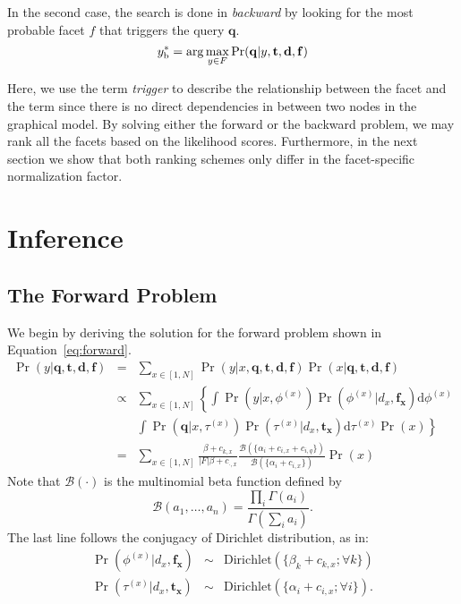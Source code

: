 In the second case, the search is done in \emph{backward} by looking for the most probable facet $f$ that triggers the query $\mathbf{q}$.
\begin{equation}y^*_{\rm b} = \arg\max_{y \in F} \Pr(\mathbf{q}|y, \mathbf{t}, \mathbf{d}, \mathbf{f}) \label{eq:backward} \end{equation}

Here, we use the term \emph{trigger} to describe the relationship between the
facet and the term since there is no direct dependencies in between two nodes
in the graphical model.  By solving either the forward or the backward problem,
we may rank all the facets based on the likelihood scores.  Furthermore, in the
next section we show that both ranking schemes only differ in the
facet-specific normalization factor.

\section{Inference}

\subsection{The Forward Problem}
We begin by deriving the solution for the forward problem shown in
Equation~\eqref{eq:forward}. 
\begin{eqnarray}
  \Pr(y|\mathbf{q}, \mathbf{t}, \mathbf{d}, \mathbf{f}) 
  &=& \sum_{x \in [1, N]} \Pr(y|x, \mathbf{q}, \mathbf{t}, \mathbf{d}, \mathbf{f}) \Pr(x|\mathbf{q}, \mathbf{t}, \mathbf{d}, \mathbf{f}) \nonumber\\
  &\propto& \sum_{x \in [1, N]} \left\{ \int \Pr(y|x, \phi^{(x)}) \Pr(\phi^{(x)}|d_x, \mathbf{f_x}) \mathrm{d}\phi^{(x)} \right. \nonumber\\
  && \left. \int \Pr(\mathbf{q}| x, \tau^{(x)}) \Pr(\tau^{(x)}|d_x, \mathbf{t_x})\mathrm{d}\tau^{(x)} \Pr(x) \right\} \nonumber\\
  &=& \sum_{x \in [1, N]} \frac{\beta + c_{k,x}}{|F|\beta + c_{\cdot,x}} \frac{\mathcal{B}(\{\alpha_i + c_{i,x} + c_{i,q} \})}{\mathcal{B}(\{\alpha_i + c_{i,x} \})} \Pr(x)
\end{eqnarray}
Note that $\mathcal{B}(\cdot)$ is the multinomial beta
function defined by \[\mathcal{B}(a_1, \ldots, a_n) = \frac{\prod_i
\Gamma(a_i)}{\Gamma(\sum_i a_i)}. \]
The last line follows the conjugacy of Dirichlet distribution, as in:
\begin{eqnarray*}
\Pr(\phi^{(x)}|d_x,\mathbf{f_x}) &\sim& \mathrm{Dirichlet}(\{\beta_k + c_{k,x}; \forall k \}) \\
\Pr(\tau^{(x)}|d_x, \mathbf{t_x}) &\sim& \mathrm{Dirichlet}(\{\alpha_i + c_{i,x}; \forall i \}).
\end{eqnarray*}

